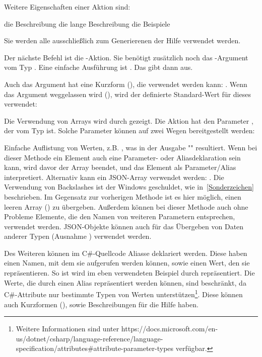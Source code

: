 Weitere Eigenschaften einer Aktion sind:
\begin{outline}
 \1 die Beschreibung
 \1 die lange Beschreibung
 \1 die Beispiele
\end{outline}
Sie werden alle ausschließlich zum Generierenen der Hilfe verwendet werden.

Der nächste Befehl ist die -Aktion.
Sie benötigt zusätzlich noch das -Argument vom Typ .
Eine einfache Ausführung ist .
Das gibt dann  aus.

Auch das Argument hat eine Kurzform (), die verwendet werden kann: .
Wenn das Argument weggelassen wird (), wird der definierte Standard-Wert für dieses verwendet:

Die Verwendung von Arrays wird durch  gezeigt.
Die Aktion hat den Parameter , der vom Typ  ist.
Solche Parameter können auf zwei Wegen bereitgestellt werden:
\begin{outline}
 \1 Einfache Auflistung von Werten, z.B. , was in der Ausgabe "" resultiert.
 Wenn bei dieser Methode ein Element auch eine Parameter- oder Aliasdeklaration sein kann, wird davor der Array beendet, und das Element als Parameter/Alias interpretiert.
 \1 Alternativ kann ein JSON-Array verwendet werden: .
 Die Verwendung von Backslashes ist der Windows  geschuldet, wie in~\ref{Sonderzeichen} beschrieben.
 Im Gegensatz zur vorherigen Methode ist es hier möglich, einen leeren Array (\inlinecode{[]}) zu übergeben.
 Außerdem können bei dieser Methode auch ohne Probleme Elemente, die den Namen von weiteren Parametern entsprechen, verwendet werden.
 JSON-Objekte können auch für das \"Ubergeben von Daten anderer Typen (Ausnahme ) verwendet werden.
\end{outline} 

Des Weiteren können im C\#-Quellcode Aliasse deklariert werden.
Diese haben einen Namen, mit dem sie aufgerufen werden können, sowie einen Wert, den sie repräsentieren.
So ist wird im eben verwendeten Beispiel  durch  repräsentiert.
Die Werte, die durch einen Alias repräsentiert werden können, sind beschränkt, da C\#-Attribute nur bestimmte Typen von Werten unterstützen\footnote{Weitere Informationen sind unter https://docs.microsoft.com/en-us/dotnet/csharp/language-reference/language-specification/attributes\#attribute-parameter-types verfügbar.}.
Diese können auch Kurzformen (), sowie Beschreibungen für die Hilfe haben.

